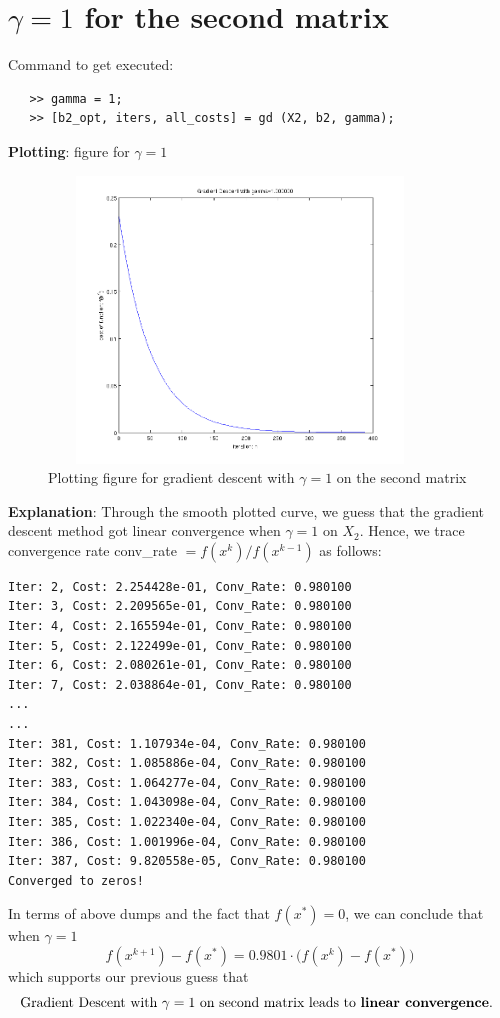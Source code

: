 \documentclass[11pt,a4paper]{article}
\begin{document}
\section{$\gamma = 1$ for the second matrix}
Command to get executed: 
\begin{verbatim}
   >> gamma = 1;
   >> [b2_opt, iters, all_costs] = gd (X2, b2, gamma);
\end{verbatim}
{\bf Plotting}: figure for $\gamma = 1$
\begin{figure}[h]
            \centering
            \includegraphics[width=4in,height=3in]{../ps1_matlab/2_gamma1.png}
            \caption{Plotting figure for gradient descent with $\gamma = 1$ on
            the second matrix}
\end{figure}

\noindent
{\bf Explanation}: 
Through the smooth plotted curve, we guess that the gradient
descent method got linear convergence when $\gamma=1$ on $X_2$. Hence, we trace
convergence rate conv\_rate $ = f(x^{k}) / f(x^{k-1})$ as follows:
\begin{verbatim}
Iter: 2, Cost: 2.254428e-01, Conv_Rate: 0.980100
Iter: 3, Cost: 2.209565e-01, Conv_Rate: 0.980100
Iter: 4, Cost: 2.165594e-01, Conv_Rate: 0.980100
Iter: 5, Cost: 2.122499e-01, Conv_Rate: 0.980100
Iter: 6, Cost: 2.080261e-01, Conv_Rate: 0.980100
Iter: 7, Cost: 2.038864e-01, Conv_Rate: 0.980100
...
...
Iter: 381, Cost: 1.107934e-04, Conv_Rate: 0.980100
Iter: 382, Cost: 1.085886e-04, Conv_Rate: 0.980100
Iter: 383, Cost: 1.064277e-04, Conv_Rate: 0.980100
Iter: 384, Cost: 1.043098e-04, Conv_Rate: 0.980100
Iter: 385, Cost: 1.022340e-04, Conv_Rate: 0.980100
Iter: 386, Cost: 1.001996e-04, Conv_Rate: 0.980100
Iter: 387, Cost: 9.820558e-05, Conv_Rate: 0.980100
Converged to zeros!
\end{verbatim}
In terms of above dumps and the fact that $f(x^{*}) = 0$, we can conclude that when $\gamma = 1$        
$$
f(x^{k+1}) - f(x^{*}) = 0.9801 \cdot \big( f(x^{k}) - f(x^{*}) \big)
$$
which supports our previous guess that
$$ 
\text{Gradient Descent with }
\gamma = 1
\text{ on second matrix leads to {\bf linear convergence}. }
$$
\end{document}
